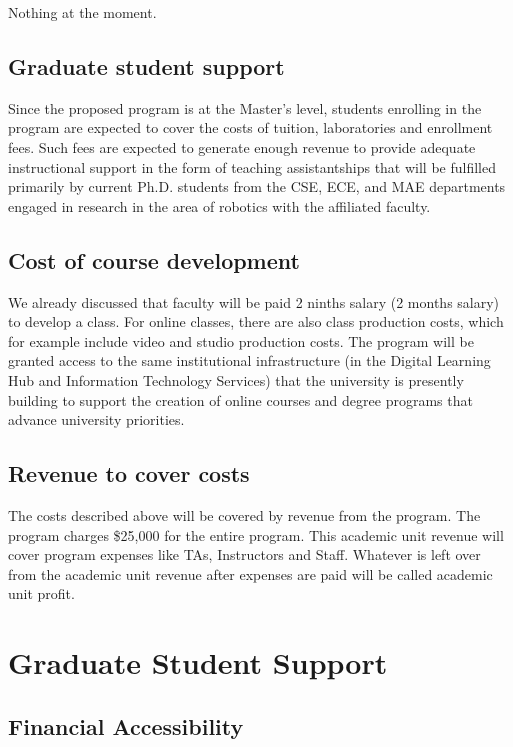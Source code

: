 \documentclass[11pt,letterpaper]{article}
\begin{document}
Nothing at the moment.

\subsection{Graduate student support}

Since the proposed program is at the Master's level, students
enrolling in the program are expected to cover the costs of tuition,
laboratories and enrollment fees. Such fees are expected to generate
enough revenue to provide adequate instructional support in the form
of teaching assistantships that will be fulfilled primarily by current
Ph.D. students from the CSE, ECE, and MAE departments engaged in
research in the area of robotics with the affiliated faculty.

\subsection{Cost of course development}

We already discussed that faculty will be paid 2 ninths salary (2
months salary) to develop a class. For online classes, there are also
class production costs, which for example include video and studio
production costs. The program will be granted access to the same
institutional infrastructure (in the Digital Learning Hub and
Information Technology Services) that the university is presently
building to support the creation of online courses and degree programs
that advance university priorities. 

\subsection{Revenue to cover costs}

The costs described above will be covered by revenue from the program.
The program charges \$25,000 for the entire program. This academic unit
revenue will cover program expenses like TAs, Instructors and Staff.
Whatever is left over from the academic unit revenue after expenses
are paid will be called academic unit profit.

\section{Graduate Student Support}

\subsection{Financial Accessibility}
\end{document}
